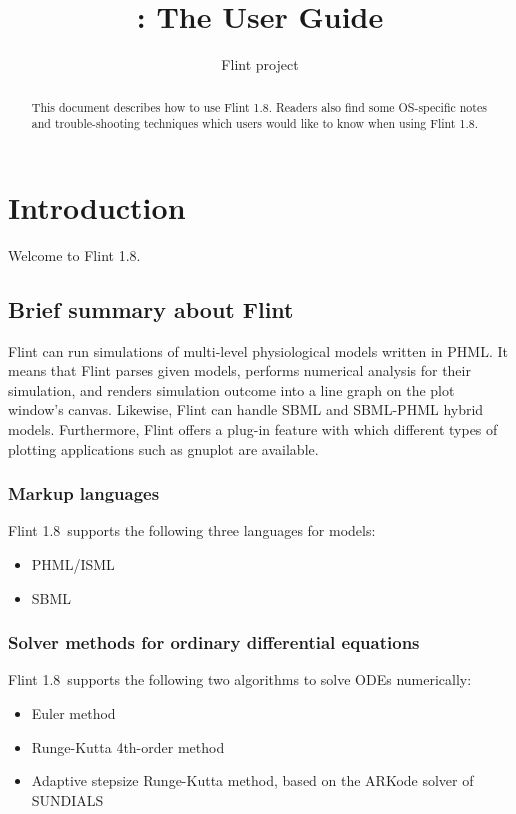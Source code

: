 \documentclass[a4paper,10pt]{report}
\title{\Flint: The User Guide}
\author{Flint project}
\def\FlintVersion{1.8}
\def\Flint{Flint \FlintVersion}
\begin{document}
\maketitle

\begin{abstract}
This document describes how to use \Flint.
Readers also find some OS-specific notes and trouble-shooting techniques which
users would like to know when using \Flint.
\end{abstract}

\tableofcontents



\chapter{Introduction}
Welcome to \Flint.

\section{Brief summary about Flint}
Flint can run simulations of multi-level physiological models written in PHML.
It means that Flint parses given models, performs numerical analysis for their
simulation, and renders simulation outcome into a line graph on the plot
window's canvas. Likewise, Flint can handle SBML and SBML-PHML hybrid models.
Furthermore, Flint offers a plug-in feature with which different types of
plotting applications such as gnuplot are available.

\subsection{Markup languages}
\Flint\ supports the following three languages for models:
\begin{itemize}
\item PHML/ISML
\item SBML
\end{itemize}

\subsection{Solver methods for ordinary differential equations}
\Flint\ supports the following two algorithms to solve ODEs numerically:
\begin{itemize}
\item Euler method
\item Runge-Kutta 4th-order method
\item Adaptive stepsize Runge-Kutta method, based on the ARKode solver of SUNDIALS
\end{itemize}
\end{document}
